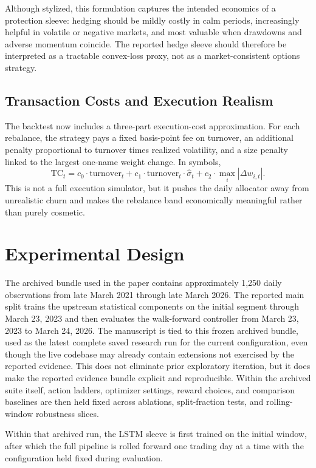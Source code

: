 \documentclass[10pt,twocolumn]{article}
\begin{document}
Although stylized, this formulation captures the intended economics of a
protection sleeve: hedging should be mildly costly in calm periods, increasingly
helpful in volatile or negative markets, and most valuable when drawdowns and
adverse momentum coincide.
The reported hedge sleeve should therefore be interpreted as a tractable
convex-loss proxy, not as a market-consistent options strategy.

\subsection{Transaction Costs and Execution Realism}

The backtest now includes a three-part execution-cost approximation. For each
rebalance, the strategy pays a fixed basis-point fee on turnover, an additional
penalty proportional to turnover times realized volatility, and a size penalty
linked to the largest one-name weight change. In symbols,
\[
\mathrm{TC}_t
= c_0 \cdot \mathrm{turnover}_t
+ c_1 \cdot \mathrm{turnover}_t \cdot \hat{\sigma}_t
+ c_2 \cdot \max_i |\Delta w_{i,t}|.
\]
This is not a full execution simulator, but it pushes the daily allocator away
from unrealistic churn and makes the rebalance band economically meaningful
rather than purely cosmetic.

\section{Experimental Design}

The archived bundle used in the paper contains approximately 1{,}250 daily
observations from late March 2021 through late March 2026. The reported main
split trains the upstream statistical components on the initial segment through
March 23, 2023 and then evaluates the walk-forward controller from March 23,
2023 to March 24, 2026. The manuscript is tied to this frozen archived bundle,
used as the latest complete saved research run for the current configuration,
even though the live codebase may already contain extensions not exercised by
the reported evidence. This does not eliminate prior exploratory iteration, but
it does make the reported evidence bundle explicit and reproducible.
Within the archived suite itself, action ladders, optimizer settings, reward
choices, and comparison baselines are then held fixed across ablations,
split-fraction tests, and rolling-window robustness slices.

Within that archived run, the LSTM sleeve is first trained on the initial
window, after which the full pipeline is rolled forward one trading day at a
time with the configuration held fixed during evaluation.
\end{document}
